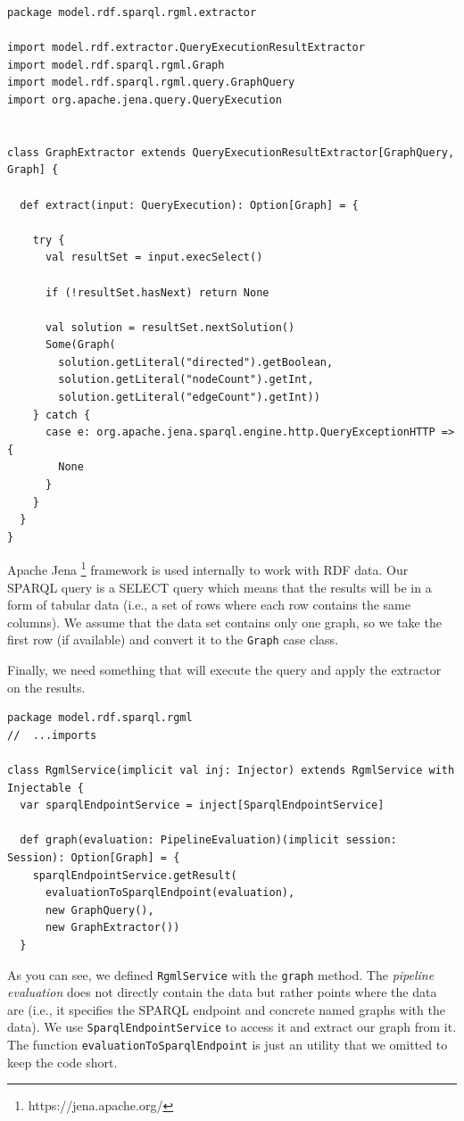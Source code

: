 \begin{verbatim}
package model.rdf.sparql.rgml.extractor

import model.rdf.extractor.QueryExecutionResultExtractor
import model.rdf.sparql.rgml.Graph
import model.rdf.sparql.rgml.query.GraphQuery
import org.apache.jena.query.QueryExecution


class GraphExtractor extends QueryExecutionResultExtractor[GraphQuery, Graph] {

  def extract(input: QueryExecution): Option[Graph] = {

    try {
      val resultSet = input.execSelect()

      if (!resultSet.hasNext) return None

      val solution = resultSet.nextSolution()
      Some(Graph(
        solution.getLiteral("directed").getBoolean,
        solution.getLiteral("nodeCount").getInt,
        solution.getLiteral("edgeCount").getInt))
    } catch {
      case e: org.apache.jena.sparql.engine.http.QueryExceptionHTTP => {
        None
      }
    }
  }
}
\end{verbatim}

Apache Jena \footnote{https://jena.apache.org/} framework is used internally to work with RDF data. Our SPARQL query is a SELECT query which means that the results will be in a form of tabular data (i.e., a set of rows where each row contains the same columns). We assume that the data set contains only one graph, so we take the first row (if available) and convert it to the \texttt{Graph} case class.

Finally, we need something that will execute the query and apply the extractor on the results.

\begin{verbatim}
package model.rdf.sparql.rgml
//  ...imports

class RgmlService(implicit val inj: Injector) extends RgmlService with Injectable {
  var sparqlEndpointService = inject[SparqlEndpointService]

  def graph(evaluation: PipelineEvaluation)(implicit session: Session): Option[Graph] = {
    sparqlEndpointService.getResult(
      evaluationToSparqlEndpoint(evaluation),
      new GraphQuery(),
      new GraphExtractor())
  }
\end{verbatim}

As you can see, we defined \texttt{RgmlService} with the \texttt{graph} method. The \emph{pipeline evaluation} does not directly contain the data but rather points where the data are (i.e., it specifies the SPARQL endpoint and concrete named graphs with the data). We use \texttt{SparqlEndpointService} to access it and extract our graph from it. The function \texttt{evaluationToSparqlEndpoint} is just an utility that we omitted to keep the code short. %

